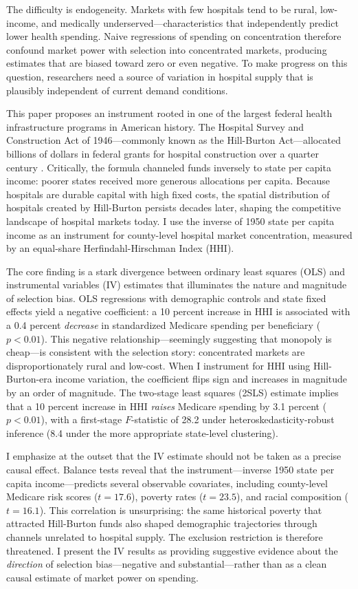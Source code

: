 \documentclass[12pt]{article}
\begin{document}
The difficulty is endogeneity. Markets with few hospitals tend to be rural, low-income, and medically underserved---characteristics that independently predict lower health spending. Naive regressions of spending on concentration therefore confound market power with selection into concentrated markets, producing estimates that are biased toward zero or even negative. To make progress on this question, researchers need a source of variation in hospital supply that is plausibly independent of current demand conditions.

This paper proposes an instrument rooted in one of the largest federal health infrastructure programs in American history. The Hospital Survey and Construction Act of 1946---commonly known as the Hill-Burton Act---allocated billions of dollars in federal grants for hospital construction over a quarter century \citep{hillburton1946}. Critically, the formula channeled funds inversely to state per capita income: poorer states received more generous allocations per capita. Because hospitals are durable capital with high fixed costs, the spatial distribution of hospitals created by Hill-Burton persists decades later, shaping the competitive landscape of hospital markets today. I use the inverse of 1950 state per capita income as an instrument for county-level hospital market concentration, measured by an equal-share Herfindahl-Hirschman Index (HHI).

The core finding is a stark divergence between ordinary least squares (OLS) and instrumental variables (IV) estimates that illuminates the nature and magnitude of selection bias. OLS regressions with demographic controls and state fixed effects yield a negative coefficient: a 10 percent increase in HHI is associated with a 0.4 percent \emph{decrease} in standardized Medicare spending per beneficiary ($p < 0.01$). This negative relationship---seemingly suggesting that monopoly is cheap---is consistent with the selection story: concentrated markets are disproportionately rural and low-cost. When I instrument for HHI using Hill-Burton-era income variation, the coefficient flips sign and increases in magnitude by an order of magnitude. The two-stage least squares (2SLS) estimate implies that a 10 percent increase in HHI \emph{raises} Medicare spending by 3.1 percent ($p < 0.01$), with a first-stage $F$-statistic of 28.2 under heteroskedasticity-robust inference (8.4 under the more appropriate state-level clustering).

I emphasize at the outset that the IV estimate should not be taken as a precise causal effect. Balance tests reveal that the instrument---inverse 1950 state per capita income---predicts several observable covariates, including county-level Medicare risk scores ($t = 17.6$), poverty rates ($t = 23.5$), and racial composition ($t = 16.1$). This correlation is unsurprising: the same historical poverty that attracted Hill-Burton funds also shaped demographic trajectories through channels unrelated to hospital supply. The exclusion restriction is therefore threatened. I present the IV results as providing suggestive evidence about the \emph{direction} of selection bias---negative and substantial---rather than as a clean causal estimate of market power on spending.
\end{document}
